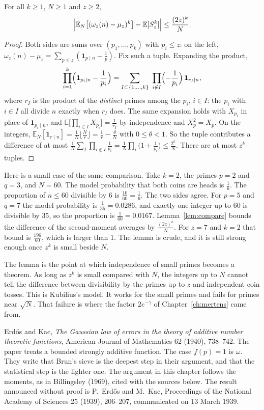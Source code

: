 \begin{lemma}\label{lem:compare}
For all $k\ge1$, $N\ge1$ and $z\ge2$,
\[
\Bigl|\mathbb E_N\bigl[(\omega_z(n)-\mu_z)^k\bigr]-\mathbb E[S_z^k]\Bigr|\le\frac{(2z)^k}N.
\]
\end{lemma}
\begin{proof}
Both sides are sums over $(p_1,\dots,p_k)$ with $p_i\le z$: on the left, $\omega_z(n)-\mu_z=\sum_{p\le z}(\mathbf 1_{p\mid n}-\frac1p)$. Fix such a tuple. Expanding the product,
\[
\prod_{i=1}^k\Bigl(\mathbf 1_{p_i\mid n}-\frac1{p_i}\Bigr)=\sum_{I\subset\{1,\dots,k\}}\ \prod_{i\notin I}\Bigl(-\frac1{p_i}\Bigr)\,\mathbf 1_{r_I\mid n},
\]
where $r_I$ is the product of the \emph{distinct} primes among the $p_i$, $i\in I$: the $p_i$ with $i\in I$ all divide $n$ exactly when $r_I$ does. The same expansion holds with $X_{p_i}$ in place of
$\mathbf 1_{p_i\mid n}$, and $\mathbb E\bigl[\prod_{i\in I}X_{p_i}\bigr]=\frac1{r_I}$ by independence and $X_p^2=X_p$. On the integers, $\mathbb E_N[\mathbf 1_{r\mid n}]=\frac1N\lfloor\frac Nr\rfloor=\frac1r-\frac\theta N$ with
$0\le\theta<1$. So the tuple contributes a difference of at most $\frac1N\sum_I\prod_{i\notin I}\frac1{p_i}=\frac1N\prod_i\bigl(1+\frac1{p_i}\bigr)\le\frac{2^k}N$. There are at most $z^k$ tuples.
\end{proof}

Here is a small case of the same comparison. Take $k=2$, the primes $p=2$ and $q=3$, and $N=60$. The model probability that both coins are heads is $\frac16$. The proportion of $n\le 60$ divisible by $6$ is $\frac{10}{60}=\frac16$. The two sides agree. For $p=5$ and $q=7$ the model probability is $\frac1{35}=0.0286$, and exactly one integer up to $60$ is divisible by $35$, so the proportion is $\frac1{60}=0.0167$. Lemma~\ref{lem:compare} bounds the difference of the second-moment averages by $\frac{(2z)^k}N$. For $z=7$ and $k=2$ that bound is $\frac{196}{60}$, which is larger than $1$. The lemma is crude, and it is still strong enough once $z^k$ is small beside $N$.

The lemma is the point at which independence of small primes becomes a theorem. As long as $z^k$ is small compared with $N$, the integers up to $N$ cannot tell the difference between divisibility by the primes up to $z$ and independent coin tosses. This is Kubilius's model. It works for the small primes and fails for primes near $\sqrt N$. That failure is where the factor $2e^{-\gamma}$ of Chapter~\ref{ch:mertens} came from.

\begin{remark}
Erd\H{o}s and Kac, \emph{The Gaussian law of errors in the theory of additive number theoretic functions}, American Journal of Mathematics 62 (1940), 738--742. The paper treats a bounded strongly additive function. The case $f(p)=1$ is $\omega$. They write that Brun's sieve is the deepest step in their argument, and that the statistical step is the lighter one. The argument in this chapter follows the moments, as in Billingsley (1969), cited with the sources below. The result announced without proof is P.~Erd\H{o}s and M.~Kac, Proceedings of the National Academy of Sciences 25 (1939), 206--207, communicated on 13 March 1939.
\end{remark}


